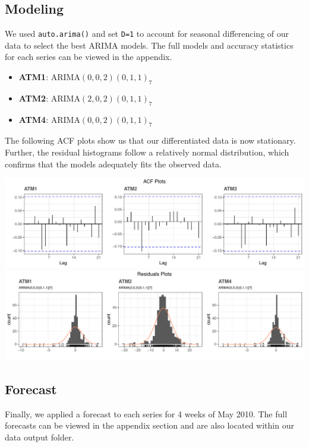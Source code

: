\documentclass[openany]{book}
\providecommand{\tightlist}{%
  \setlength{\itemsep}{0pt}\setlength{\parskip}{0pt}}
\begin{document}
\hypertarget{modeling}{%
\subsection{Modeling}\label{modeling}}

We used \texttt{auto.arima()} and set \texttt{D=1} to account for
seasonal differencing of our data to select the best ARIMA models. The
full models and accuracy statistics for each series can be viewed in the
appendix.

\begin{itemize}
\tightlist
\item
  \textbf{ATM1}: ARIMA\((0,0,2)(0,1,1)_7\)
\item
  \textbf{ATM2}: ARIMA\((2,0,2)(0,1,1)_7\)
\item
  \textbf{ATM4}: ARIMA\((0,0,2)(0,1,1)_7\)
\end{itemize}

The following ACF plots show us that our differentiated data is now
stationary. Further, the residual histograms follow a relatively normal
distribution, which confirms that the models adequately fits the
observed data.

\includegraphics{Part-A-JM_files/figure-latex/unnamed-chunk-6-1.pdf}
\includegraphics{Part-A-JM_files/figure-latex/unnamed-chunk-6-2.pdf}

\hypertarget{forecast}{%
\subsection{Forecast}\label{forecast}}

Finally, we applied a forecast to each series for 4 weeks of May 2010.
The full forecasts can be viewed in the appendix section and are also
located within our data output folder.
\end{document}
